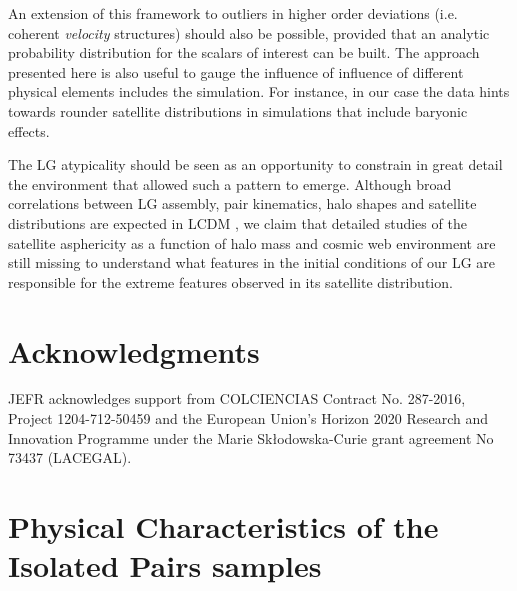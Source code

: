 \documentclass[a4paper,fleqn,usenatbib]{mnras}
\begin{document}
An extension of this framework to outliers in higher order deviations
(i.e. coherent \emph{velocity} structures) should also be possible, 
provided that an analytic probability distribution for the scalars of
interest can be built.  
The approach presented here is also useful to gauge the influence of 
influence of different physical elements includes the simulation. 
For instance, in our case the data hints towards rounder satellite
distributions in simulations that include baryonic effects.  

The LG atypicality should be seen as an opportunity to constrain in
great detail the environment that allowed such a pattern to emerge. 
Although broad correlations between LG assembly, pair kinematics, halo
shapes and satellite distributions are expected in LCDM
\citep{2011MNRAS.417.1434F,2014MNRAS.443.1090F,2015ApJ...799...45F,2015MNRAS.452.1052L},
we claim that detailed studies of the satellite asphericity as a
function of halo mass and cosmic web environment are still missing to
understand what features in the initial conditions of our LG are
responsible for the extreme features observed in its satellite
distribution. 

\section*{Acknowledgments} 
JEFR acknowledges support from COLCIENCIAS Contract No. 287-2016,
Project 1204-712-50459 and the European Union's Horizon 2020 Research and Innovation
Programme under the Marie Sk\l{}odowska-Curie grant agreement No 73437
(LACEGAL).   
  



\appendix


\section{Physical Characteristics of the Isolated Pairs samples}
\label{appendix:physical}
\end{document}
